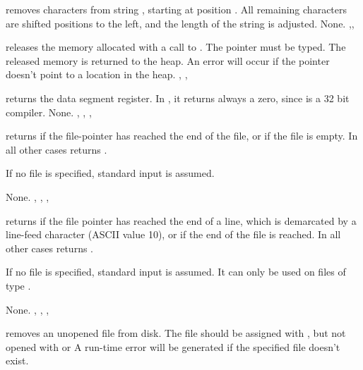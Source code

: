 \documentclass{report}
\begin{document}
{ removes  characters from string , starting
at position . All remaining characters are shifted  
positions to the left, and the length of the string is adjusted.
}
{None.}
{,,}



{ releases the memory allocated with a call to .
The pointer  must be typed. The released memory is returned to the
heap.}
{An error will occur if the pointer doesn't point to a location in the
heap.}
{, , }



{ returns the data segment register. In \fpc, it returns always a
zero, since \fpc is a 32 bit compiler.}
{None.}
{, , , }



{ returns  if the file-pointer has reached the end of the
file, or if the file is empty. In all other cases  returns
.

If no file  is specified, standard input is assumed.}
{None.}
{, , , }



{ returns  if the file pointer has reached the end of a
line, which is demarcated by a line-feed character (ASCII value 10), or if
the end of the file is reached.
In all other cases  returns .

If no file  is specified, standard input is assumed.
It can only be used on files of type .}
{None.}
{, , , }



{ removes an unopened file from disk. The file should be
assigned with , but not opened with  or }
{A run-time error will be generated if the specified file doesn't exist.}
{}


\end{document}
